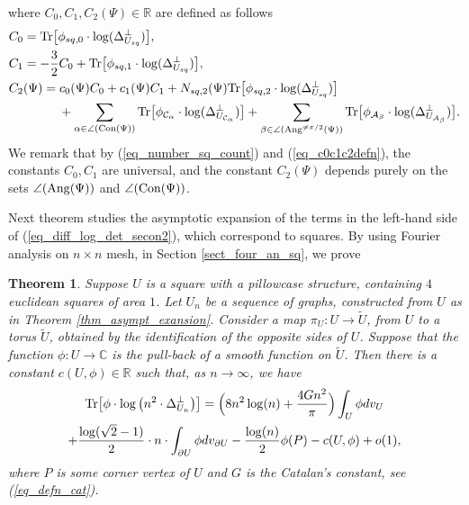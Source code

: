 \documentclass[12pt]{article}
\numberwithin{equation}{section}
\theoremstyle{theorem}
\newtheorem{thm}{Theorem}[section]
\theoremstyle{definition}
\theoremstyle{remark}
\newcommand{\comp}{\mathbb{C}}
\newcommand{\real}{\mathbb{R}}
\newcommand{\laplcomp}{\Delta}
\newcommand{\tr}[1]{{\rm{Tr}} \big[ #1 \big]}
\begin{document}
	where $C_0, C_1, C_2(\Psi) \in \real$ are defined as follows
	\begin{equation}\label{eq_c0c1c2defn}
	\begin{aligned}
		&
		C_0 =  \tr{\phi_{sq, 0} \cdot \log ( \laplcomp_{U_{sq}}^{\perp}) },
		\\
		&
		C_1 = -\frac{3}{2}C_0 +  \tr{\phi_{sq, 1} \cdot \log ( \laplcomp_{U_{sq}}^{\perp}) },
		\\
		&
		C_2(\Psi) =  c_0(\Psi) C_0 + c_1(\Psi) C_1
		+
		N_{sq, 2}(\Psi) \tr{\phi_{sq, 2} \cdot \log (\laplcomp_{U_{sq}}^{\perp}) }
		\\
		&
		\qquad \qquad 
		+
		\sum_{\alpha \in \angle({\rm{Con}}(\Psi))}
		\tr{\phi_{\mathcal{C}_{\alpha}} \cdot \log (\laplcomp_{U_{\mathcal{C}_{\alpha}}}^{\perp})  }
		+
		\sum_{\beta \in \angle({\rm{Ang}}^{\neq \pi/2}(\Psi))}
		\tr{\phi_{\mathcal{A}_{\beta}} \cdot \log (\laplcomp_{U_{\mathcal{A}_{\beta}}}^{\perp})  }.
	\end{aligned}
	\end{equation}
	We remark that by (\ref{eq_number_sq_count}) and (\ref{eq_c0c1c2defn}), the constants $C_0, C_1$ are universal, and the constant $C_2(\Psi)$ depends purely on the sets $\angle({\rm{Ang}}(\Psi))$ and $\angle({\rm{Con}}(\Psi))$.
	\par 
	Next theorem studies the asymptotic expansion of the terms in the left-hand side of (\ref{eq_diff_log_det_secon2}), which correspond to squares. 
	By using Fourier analysis on $n \times n$ mesh, in Section \ref{sect_four_an_sq}, we prove
	\begin{thm}\label{thm_explicit_calc}
		Suppose $U$ is a square with a pillowcase structure, containing $4$ euclidean squares of area $1$. 
		Let $U_n$ be a sequence of graphs, constructed from $U$ as in Theorem \ref{thm_asympt_exansion}.
		Consider a map $\pi_U : U \to \tilde{U}$, from $U$ to a torus $\tilde{U}$, obtained by the identification of the opposite sides of $U$.
		Suppose that the function $\phi : U \to \comp$ is the pull-back of a smooth function on $\tilde{U}$. 
		Then there is a constant $c(U, \phi) \in \real$ such that, as $n \to \infty$, we have
		\begin{multline}\label{eq_thm_explicit_calc}
			\tr{ \phi \cdot \log \big( n^2\cdot \laplcomp_{U_{n}}^{\perp} \big)}
			= 
			\Big(
			8 n^2 \log(n) 
			+
			\frac{4Gn^2}{\pi}
			\Big)			
			 \int_{U} \phi dv_{U}
			\\
			+ 
			\frac{\log(\sqrt{2} - 1)}{2}
			\cdot
			 n  
			 \cdot
			 \int_{\partial U} \phi dv_{\partial U}
			-
			\frac{\log(n)}{2} \phi(P)
			-
			c(U, \phi) + o(1),
		\end{multline}
		where $P$ is some corner vertex of $U$ and $G$ is the Catalan's constant, see (\ref{eq_defn_cat}).
	\end{thm}
\end{document}
